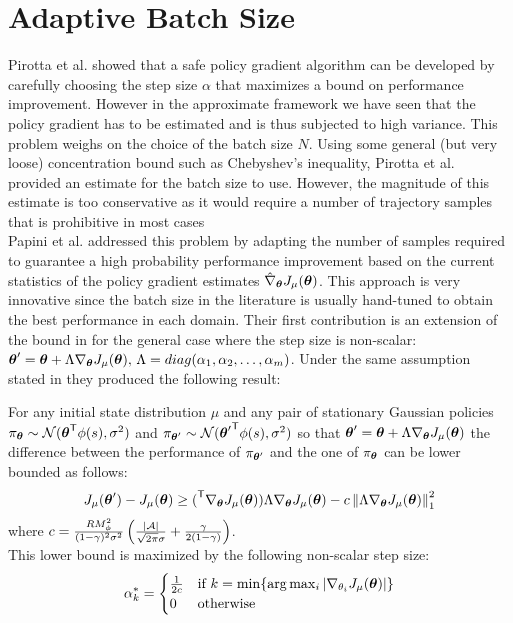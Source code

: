\section{Adaptive Batch Size}
\label{sec:abs}
Pirotta et al. showed that a safe policy gradient algorithm can be developed by carefully choosing the step size $\alpha$ that maximizes a bound on performance improvement. However in the approximate framework we have seen that the policy gradient has to be estimated and is thus subjected to high variance. This problem weighs on the choice of the batch size $N$. Using some general (but very loose) concentration bound such as Chebyshev's inequality, Pirotta et al. provided an estimate for the batch size to use. However, the magnitude of this estimate is too conservative as it would require a number of trajectory samples that is prohibitive in most cases\\
Papini et al. \cite{adaptive_batch} addressed this problem by adapting the number of samples required to guarantee a high probability performance improvement based on the current statistics of the policy gradient estimates $\estgradj$. This approach is very innovative since the batch size in the literature is usually hand-tuned to obtain the best performance in each domain. Their first contribution is an extension of the bound in  for the general case where the step size is non-scalar: $\vtheta' = \vtheta + \Lambda \gradj,\, \Lambda=diag(\alpha_1, \alpha_2,\ldots,\alpha_m)$. Under the same assumption stated in  they produced the following result:
\begin{theorem}
For any initial state distribution $\mu$ and any pair of stationary Gaussian policies $\pi_{\vtheta}\sim\mathcal{N}(\transpose{\vtheta}\phi(s),\sigma^2)$ and $\pi_{\vtheta'}\sim\mathcal{N}(\transpose{\vtheta'}\phi(s),\sigma^2)$ so that $\vtheta' = \vtheta + \Lambda\gradj$ the difference between the performance of $\pi_{\vtheta'}$ and the one of $\pi_{\vtheta}$ can be lower bounded as follows:
\[
J_\mu(\vtheta') - J_\mu(\vtheta) \geq \transpose(\gradj)\Lambda\gradj - c\norm[1]{\Lambda\gradj}^2
\]
where $c=\frac{RM_\phi^2}{(1-\gamma)^2\sigma^2}\left(\frac{|\aspace|}{\sqrt{2\pi}\sigma} + \frac{\gamma}{2(1-\gamma)}\right)$.\\
This lower bound is maximized by the following non-scalar step size:
\[
\alpha_k^* = \begin{cases} \frac{1}{2c} & \textrm{if }k=\min\{\arg\max_i|\nabla_{\theta_i} J_\mu(\vtheta)|\} \\ 0 & \textrm{otherwise}\end{cases}
\]
\end{theorem}

